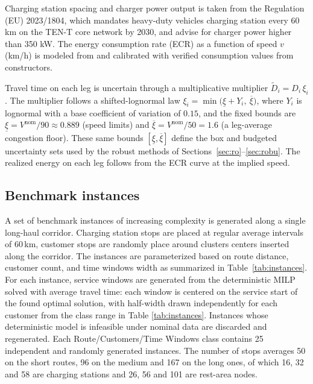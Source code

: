 \documentclass[preprint,12pt,3p]{elsarticle}
\begin{document}
Charging station spacing and charger power output is taken from the Regulation (EU) 2023/1804, which mandates heavy-duty vehicles charging station every 60 km on the TEN-T core network by 2030, and advise for charger power higher than 350 kW. The energy consumption rate (ECR) as a function of speed $v$ (km/h) is modeled from \citet{gao_estimating_2025} and calibrated with verified consumption values from constructors.


Travel time on each leg is uncertain through a multiplicative multiplier $\tilde D_i = D_i\,\xi_i$. The multiplier follows a shifted-lognormal law $\xi_i = \min\!\bigl(\underline\xi + Y_i,\ \overline\xi\bigr)$, where $Y_i$ is lognormal with a base coefficient of variation of $0.15$, and the fixed bounds are $\underline\xi = V^{\mathrm{nom}}/90 \approx 0.889$ (speed limits) and $\overline\xi = V^{\mathrm{nom}}/50 = 1.6$ (a leg-average congestion floor). These same bounds $[\underline\xi,\overline\xi]$ define the box and budgeted uncertainty sets used by the robust methods of Sections~\ref{sec:ro}--\ref{sec:robu}. The realized energy on each leg follows from the ECR curve at the implied speed.


\subsection{Benchmark instances}

A set of benchmark instances of increasing complexity is generated along a single long-haul corridor. Charging station stops are placed at regular average intervals of 60\,km, customer stops are randomly place around clusters centers inserted along the corridor. The instances are parameterized based on route distance, customer count, and time windows width as summarized in Table~\ref{tab:instances}. For each instance, service windows are generated from the deterministic MILP solved with average travel time: each window is centered on the service start of the found optimal solution, with half-width drawn independently for each customer from the class range in Table \ref{tab:instances}. Instances whose deterministic model is infeasible under nominal data are discarded and regenerated. Each Route/Customers/Time Windows class contains 25 independent and randomly generated instances. The number of stops averages 50 on the short routes, 96 on the medium and 167 on the long ones, of which 16, 32 and 58 are charging stations and 26, 56 and 101 are rest-area nodes.
\end{document}
